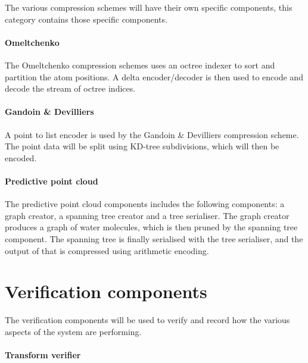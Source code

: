 The various compression schemes will have their own specific components, this
category contains those specific components.

\paragraph{Omeltchenko}

The Omeltchenko compression schemes uses an octree indexer to sort and
partition the atom positions. A delta encoder/decoder is then used to encode
and decode the stream of octree indices.


\paragraph{Gandoin \& Devilliers}

A point to list encoder is used by the Gandoin \& Devilliers compression
scheme. The point data will be split using KD-tree subdivisions, which will
then be encoded.



\paragraph{Predictive point cloud}

The predictive point cloud components includes the following components: a
graph creator, a spanning tree creator and a tree serialiser. The graph creator
produces a graph of water molecules, which is then pruned by the spanning tree
component. The spanning tree is finally serialised with the tree serialiser,
and the output of that is compressed using arithmetic encoding.



\section{Verification components}
\label{sec:verificationcomponents}

The verification components will be used to verify and record how the various
aspects of the system are performing.

\paragraph{Transform verifier}

